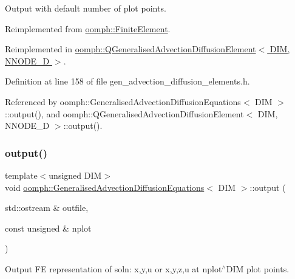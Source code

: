Output with default number of plot points. 



Reimplemented from \hyperlink{classoomph_1_1FiniteElement_a2ad98a3d2ef4999f1bef62c0ff13f2a7}{oomph\+::\+Finite\+Element}.



Reimplemented in \hyperlink{classoomph_1_1QGeneralisedAdvectionDiffusionElement_adcbd395387f1665caeede9ee8020a8cc}{oomph\+::\+Q\+Generalised\+Advection\+Diffusion\+Element$<$ D\+I\+M, N\+N\+O\+D\+E\+\_\+D $>$}.



Definition at line 158 of file gen\+\_\+advection\+\_\+diffusion\+\_\+elements.\+h.



Referenced by oomph\+::\+Generalised\+Advection\+Diffusion\+Equations$<$ D\+I\+M $>$\+::output(), and oomph\+::\+Q\+Generalised\+Advection\+Diffusion\+Element$<$ D\+I\+M, N\+N\+O\+D\+E\+\_\+D $>$\+::output().

\mbox{\label{classoomph_1_1GeneralisedAdvectionDiffusionEquations_a44995055f98a97ce229609832a03867e}} 
\subsubsection{\texorpdfstring{output()}{output()}\hspace{0.1cm}{\footnotesize\ttfamily [2/4]}}
{\footnotesize\ttfamily template$<$unsigned D\+IM$>$ \\
void \hyperlink{classoomph_1_1GeneralisedAdvectionDiffusionEquations}{oomph\+::\+Generalised\+Advection\+Diffusion\+Equations}$<$ D\+IM $>$\+::output (\begin{DoxyParamCaption}\item[{std\+::ostream \&}]{outfile,  }\item[{const unsigned \&}]{nplot }\end{DoxyParamCaption})\hspace{0.3cm}{\ttfamily [virtual]}}



Output FE representation of soln\+: x,y,u or x,y,z,u at nplot$^\wedge$\+D\+IM plot points. 

